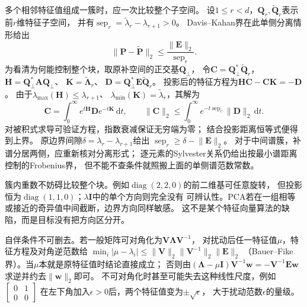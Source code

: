 多个相邻特征值组成一簇时，应一次比较整个子空间。
设$1\leq r<d$，$\bm Q_r,\widetilde{\bm Q}_r$表示前$r$维特征子空间，
并有$\operatorname{sep}_r=\widetilde\lambda_r-\lambda_{r+1}>0$。
Davis--Kahan界在此单侧分离情形给出
\[
 \lVert\bm P-\widetilde{\bm P}\rVert_2
 \leq\frac{\lVert\bm E\rVert_2}{\operatorname{sep}_r}.
\]
为看清为何能控制整个块，取原补空间的正交基$\bm Q_\perp$，
令$\bm C=\bm Q_\perp^*\widetilde{\bm Q}_r$，
$\bm H=\bm Q_\perp^*\bm A\bm Q_\perp$、
$\bm K=\widetilde{\bm\Lambda}_r$、
$\bm D=\bm Q_\perp^*\bm E\widetilde{\bm Q}_r$。
投影后的特征方程为$\bm H\bm C-\bm C\bm K=-\bm D$。
由于$\lambda_{\max}(\bm H)\leq\lambda_{r+1}$、
$\lambda_{\min}(\bm K)=\widetilde\lambda_r$，其解为
\[
 \bm C=\int_0^\infty e^{t\bm H}\bm D e^{-t\bm K}\,\mathrm dt,
 \qquad
 \lVert\bm C\rVert_2
 \leq\int_0^\infty e^{-t\operatorname{sep}_r}\lVert\bm D\rVert_2\,\mathrm dt.
\]
对被积式求导可验证方程，指数衰减保证无穷端为零；
结合投影距离恒等式便得到上界。
原边界间隙$\delta=\lambda_r-\lambda_{r+1}$给出
$\operatorname{sep}_r\geq\delta-\lVert\bm E\rVert_2$。
对于中间谱簇，补谱分居两侧，应重新核对分离形式；
逐元素的Sylvester关系仍给出按最小谱距离控制的Frobenius界，
但不能不查条件就照搬上面的单侧谱范数常数。

簇内重数不妨碍比较整个块。例如$\operatorname{diag}(2,2,0)$的前二维基可任意旋转，
但投影恒为$\operatorname{diag}(1,1,0)$；$\lambda\bm I$中的单个方向则完全没有
可辨认性。PCA若在一组相等或接近的奇异值中间截断，边界方向同样敏感。
这不是某个特征向量算法的缺陷，而是目标没有把方向区分开。

自伴条件不可删去。若一般矩阵可对角化为$\bm V\bm\Lambda\bm V^{-1}$，
对扰动后任一特征值$\mu$，特征方程及对角逆范数给
$\min_i|\mu-\lambda_i|\leq
\lVert\bm V\rVert_2\lVert\bm V^{-1}\rVert_2\lVert\bm E\rVert_2$
（Bauer--Fike界）。当$\mu$本就是原特征值时结论直接成立；
否则由$(\bm\Lambda-\mu\bm I)\bm V^{-1}\bm w=-\bm V^{-1}\bm E\bm w$
求逆并约去$\lVert\bm w\rVert_2$即可。
不可对角化时甚至可能失去这种线性尺度，例如
$\left[\begin{smallmatrix}0&1\\0&0\end{smallmatrix}\right]$
在左下角加入$\epsilon>0$后，两个特征值变为$\pm\sqrt\epsilon$，
大于扰动范数$\epsilon$的量级。


